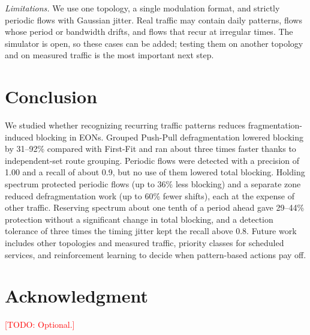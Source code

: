 \documentclass[conference]{IEEEtran}
\newcommand{\todo}[1]{\textcolor{red}{[TODO: #1]}}
\begin{document}
\textit{Limitations.} We use one topology, a single modulation format, and strictly periodic flows with Gaussian jitter. Real traffic may contain daily patterns, flows whose period or bandwidth drifts, and flows that recur at irregular times. The simulator is open, so these cases can be added; testing them on another topology and on measured traffic is the most important next step.

\section{Conclusion}\label{sec:conclusion}
We studied whether recognizing recurring traffic patterns reduces fragmentation-induced blocking in EONs. Grouped Push-Pull defragmentation lowered blocking by 31--92\% compared with First-Fit and ran about three times faster thanks to independent-set route grouping. Periodic flows were detected with a precision of 1.00 and a recall of about 0.9, but no use of them lowered total blocking. Holding spectrum protected periodic flows (up to 36\% less blocking) and a separate zone reduced defragmentation work (up to 60\% fewer shifts), each at the expense of other traffic. Reserving spectrum about one tenth of a period ahead gave 29--44\% protection without a significant change in total blocking, and a detection tolerance of three times the timing jitter kept the recall above 0.8. Future work includes other topologies and measured traffic, priority classes for scheduled services, and reinforcement learning to decide when pattern-based actions pay off.

\section*{Acknowledgment}
\todo{Optional.}
\end{document}
